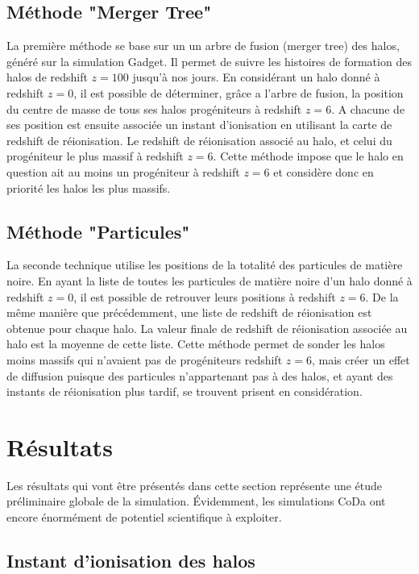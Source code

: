 \subsection{Méthode "Merger Tree"}
La première méthode se base sur un un arbre de fusion (merger tree) des halos, généré sur la simulation Gadget.
Il permet de suivre les histoires de formation des halos de redshift $z=100$ jusqu'à nos jours.
En considérant un halo donné à redshift $z=0$, il est possible de déterminer, grâce a l'arbre de fusion, la position du centre de masse de tous ses halos progéniteurs à redshift $z=6$.
A chacune de ses position est ensuite associée un instant d'ionisation en utilisant la carte de redshift de réionisation.
Le redshift de réionisation associé au halo, et celui du progéniteur le plus massif à redshift $z=6$.
Cette méthode impose que le halo en question ait au moins un progéniteur à redshift $z=6$ et considère donc en priorité les halos les plus massifs.

\subsection{Méthode "Particules"}
La seconde technique utilise les positions de la totalité des particules de matière noire.
En ayant la liste de toutes les particules de matière noire d'un halo donné à redshift $z=0$, il est possible de retrouver leurs positions à redshift $z=6$.
De la même manière que précédemment, une liste de redshift de réionisation est obtenue pour chaque halo.
La valeur finale de redshift de réionisation associée au halo est la moyenne de cette liste.
Cette méthode permet de sonder les halos moins massifs qui n'avaient pas de progéniteurs redshift $z=6$, mais créer un effet de diffusion puisque des particules n'appartenant pas à des halos, et ayant des instants de réionisation plus tardif, se trouvent prisent en considération.

\section{Résultats}

Les résultats qui vont être présentés dans cette section représente une étude préliminaire globale de la simulation.
Évidemment, les simulations \ac{CoDa} ont encore énormément de potentiel scientifique à exploiter.

\subsection{Instant d'ionisation des halos}

